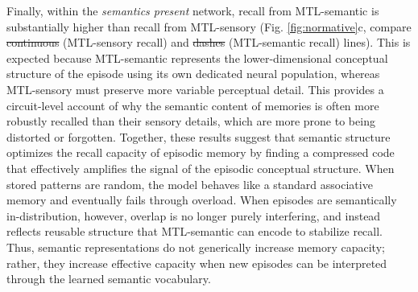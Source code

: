 \documentclass{article}
\providecommand{\DIFaddtex}[1]{{\protect\color{blue}\uwave{#1}}} %
\providecommand{\DIFdeltex}[1]{{\protect\color{red}\sout{#1}}}                      %
\providecommand{\DIFaddbegin}{} %
\providecommand{\DIFaddend}{} %
\providecommand{\DIFdelbegin}{} %
\providecommand{\DIFdelend}{} %
\providecommand{\DIFadd}[1]{\texorpdfstring{\DIFaddtex{#1}}{#1}} %
\providecommand{\DIFdel}[1]{\texorpdfstring{\DIFdeltex{#1}}{}} %
\begin{document}
\newline\newline
Finally, within the \textit{semantics present} network, recall from MTL-semantic is substantially higher than recall from MTL-sensory (Fig. \ref{fig:normative}c, compare \DIFdelbegin \DIFdel{continuous }\DIFdelend \DIFaddbegin \DIFadd{solid }\DIFaddend (MTL-sensory recall) and \DIFdelbegin \DIFdel{dashes }\DIFdelend \DIFaddbegin \DIFadd{dashed }\DIFaddend (MTL-semantic recall) lines). This is expected because MTL-semantic represents the lower-dimensional conceptual structure of the episode using its own dedicated neural population, whereas MTL-sensory must preserve more variable perceptual detail. This provides a circuit-level account of why the semantic content of memories is often more robustly recalled than their sensory details, which are more prone to being distorted or forgotten.
\newline\newline
Together, these results suggest that semantic structure optimizes the recall capacity of episodic memory by finding a compressed code that effectively amplifies the signal of the episodic conceptual structure. When stored patterns are random, the model behaves like a standard associative memory and eventually fails through overload. When episodes are semantically in-distribution, however, overlap is no longer purely interfering, and instead reflects reusable structure that MTL-semantic can encode to stabilize recall. Thus, semantic representations do not generically increase memory capacity; rather, they increase effective capacity when new episodes can be interpreted through the learned semantic vocabulary.
\end{document}
